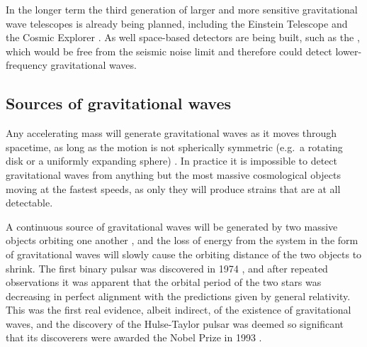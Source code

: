 \begin{colsection}
\begin{colsection}
In the longer term the third generation of larger and more sensitive gravitational wave telescopes is already being planned, including the Einstein Telescope \citep{EinsteinTelescope} and the Cosmic Explorer \citep{CosmicExplorer}. As well space-based detectors are being built, such as the  \citep{LISA}, which would be free from the seismic noise limit and therefore could detect lower-frequency gravitational waves.

\end{colsection}


\subsection{Sources of gravitational waves}
\label{sec:gw_sources}
\begin{colsection}

Any accelerating mass will generate gravitational waves as it moves through spacetime, as long as the motion is not spherically symmetric (e.g.\ a rotating disk or a uniformly expanding sphere) \citep{BIGcardiff,BIGparis}. In practice it is impossible to detect gravitational waves from anything but the most massive cosmological objects moving at the fastest speeds, as only they will produce strains that are at all detectable.

A continuous source of gravitational waves will be generated by two massive objects orbiting one another \citep{GW_sources}, and the loss of energy from the system in the form of gravitational waves will slowly cause the orbiting distance of the two objects to shrink. The first binary pulsar was discovered in 1974 \citep{HulseTaylor}, and after repeated observations it was apparent that the orbital period of the two stars was decreasing in perfect alignment with the predictions given by general relativity. This was the first real evidence, albeit indirect, of the existence of gravitational waves, and the discovery of the Hulse-Taylor pulsar was deemed so significant that its discoverers were awarded the Nobel Prize in 1993 \citep{HulseTaylor2}.


\end{colsection}
\end{colsection}
